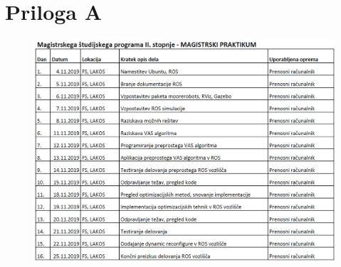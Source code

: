 \chapter{Priloga A}\label{cha:priloga}
\begin{figure}[H]
	\centering
	\includegraphics[width=16cm]{pic/cas2.jpg}
\end{figure}
